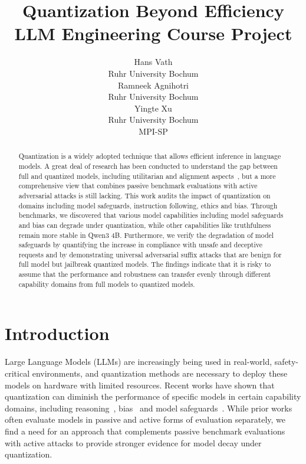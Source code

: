 \documentclass{article}
\title{
  Quantization Beyond Efficiency \\
  \vspace{1em}
  \small{\normalfont LLM Engineering Course Project}
}
\author{
  Hans Vath\\
  Ruhr University Bochum \\
  \And
  Ramneek Agnihotri \\
  Ruhr University Bochum \\
  \And
  Yingte Xu\\
  Ruhr University Bochum \\
  MPI-SP \\
}
\begin{document}
\maketitle

\begin{abstract}
	
Quantization is a widely adopted technique that allows efficient inference in language models.
A great deal of research has been conducted to understand
the gap between full and quantized models, including utilitarian and alignment aspects~\cite{liu2025quantizationhurtsreasoningempirical,kirsten,kharinaev,marcuzzi,rath,jin}, 
but a more comprehensive view that combines passive benchmark evaluations with active adversarial attacks is still lacking.
This work audits the impact of quantization on domains including model safeguards, instruction following, ethics and bias.
Through benchmarks, we discovered that various model capabilities including model safeguards and bias can degrade under quantization,
 while other capabilities like truthfulness remain more stable in Qwen3 4B.
Furthermore, we verify the degradation of model safeguards by quantifying the increase in compliance with unsafe and deceptive requests and
 by demonstrating universal adversarial suffix attacks that are benign for full model but jailbreak quantized models. 
The findings indicate that it is risky to assume that the performance and 
robustness can transfer evenly through different capability domains from full models to quantized models.

\end{abstract}


\section{Introduction}
Large Language Models (LLMs) are increasingly being used in real-world, safety-critical environments, 
and quantization methods are necessary to deploy these models on hardware with limited resources.
Recent works have shown that quantization can diminish the performance of specific models in
certain capability domains, including reasoning~\cite{liu2025quantizationhurtsreasoningempirical}, bias~\cite{kirsten} and model safeguards~\cite{kharinaev}.
While prior works often evaluate models in passive and active forms of evaluation separately, we find a need for an approach that 
complements passive benchmark evaluations with active attacks to provide stronger evidence for model decay under quantization. 
\end{document}
